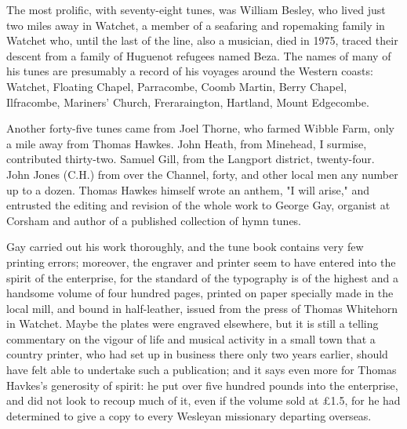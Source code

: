 The most prolific, with seventy-eight tunes, was William Besley, who lived just two miles away in Watchet, a member of a seafaring and ropemaking family in Watchet who, until the last of the line, also a musician, died in 1975, traced their descent from a family of Huguenot refugees named Beza. The names of many of his tunes are presumably a record of his voyages around the Western coasts: Watchet, Floating Chapel, Parracombe, Coomb Martin, Berry Chapel, Ilfracombe, Mariners' Church, Freraraington, Hartland, Mount Edgecombe.

Another forty-five tunes came from Joel Thorne, who farmed Wibble Farm, only a mile away from Thomas Hawkes. John Heath, from Minehead, I surmise, contributed thirty-two. Samuel Gill, from the Langport district, twenty-four. John Jones (C.H.) from over the Channel, forty, and other local men any number up to a dozen. Thomas Hawkes himself wrote an anthem, "I will arise," and entrusted the editing and revision of the whole work to George Gay, organist at Corsham and author of a published collection of hymn tunes.

Gay carried out his work thoroughly, and the tune book contains very few printing errors; moreover, the engraver and printer seem to have entered into the spirit of the enterprise, for the standard of the typography is of the highest and a handsome volume of four hundred pages, printed on paper specially made in the local mill, and bound in half-leather, issued from the press of Thomas Whitehorn in Watchet. Maybe the plates were engraved elsewhere, but it is still a telling commentary on the vigour of life and musical activity in a small town that a country printer, who had set up in business there only two years earlier, should have felt able to undertake such a publication; and it says even more for Thomas Havkes's generosity of spirit: he put over five hundred pounds into the enterprise, and did not look to recoup much of it, even if the volume sold at £1.5, for he had determined to give a copy to every Wesleyan missionary departing overseas.

